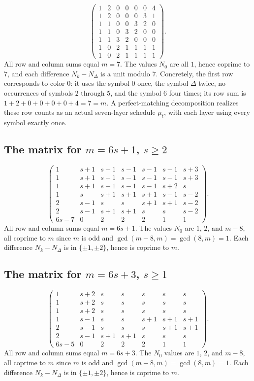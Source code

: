 \documentclass[11pt]{article}
\theoremstyle{definition}
\begin{document}
\[
\begin{pmatrix}
1&2&0&0&0&0&4\\
1&2&0&0&0&3&1\\
1&1&0&0&3&2&0\\
1&1&0&3&2&0&0\\
1&1&3&2&0&0&0\\
1&0&2&1&1&1&1\\
1&0&2&1&1&1&1
\end{pmatrix}.
\]
All row and column sums equal \(m=7\).  The values \(N_0\) are all \(1\), hence coprime to \(7\), and each difference \(N_k-N_\Delta\) is a unit modulo \(7\).  Concretely, the first row corresponds to color \(0\): it uses the symbol \(0\) once, the symbol \(\Delta\) twice, no occurrences of symbols \(2\) through \(5\), and the symbol \(6\) four times; its row sum is \(1+2+0+0+0+0+4=7=m\).  A perfect-matching decomposition realizes these row counts as an actual seven-layer schedule \(\mu_t\), with each layer using every symbol exactly once.

\subsection{The matrix for \texorpdfstring{\(m=6s+1\), \(s\ge2\)}{m=6s+1, s>=2}}

\[
\begin{pmatrix}
1&s+1&s-1&s-1&s-1&s-1&s+3\\
1&s+1&s-1&s-1&s-1&s-1&s+3\\
1&s+1&s-1&s-1&s-1&s+2&s\\
1&s&s+1&s+1&s+1&s-1&s-2\\
2&s-1&s&s&s+1&s+1&s-2\\
2&s-1&s+1&s+1&s&s&s-2\\
6s-7&0&2&2&2&1&1
\end{pmatrix}.
\]
All row and column sums equal \(m=6s+1\).  The values \(N_0\) are \(1\), \(2\), and \(m-8\), all coprime to \(m\) since \(m\) is odd and \(\gcd(m-8,m)=\gcd(8,m)=1\).  Each difference \(N_k-N_\Delta\) is in \(\{\pm1,\pm2\}\), hence is coprime to \(m\).

\subsection{The matrix for \texorpdfstring{\(m=6s+3\), \(s\ge1\)}{m=6s+3, s>=1}}

\[
\begin{pmatrix}
1&s+2&s&s&s&s&s\\
1&s+2&s&s&s&s&s\\
1&s+2&s&s&s&s&s\\
1&s-1&s&s&s+1&s+1&s+1\\
2&s-1&s&s&s&s+1&s+1\\
2&s-1&s+1&s+1&s&s&s\\
6s-5&0&2&2&2&1&1
\end{pmatrix}.
\]
All row and column sums equal \(m=6s+3\).  The \(N_0\) values are \(1\), \(2\), and \(m-8\), all coprime to \(m\) since \(m\) is odd and \(\gcd(m-8,m)=\gcd(8,m)=1\).  Each difference \(N_k-N_\Delta\) is in \(\{\pm1,\pm2\}\), hence is coprime to \(m\).
\end{document}
